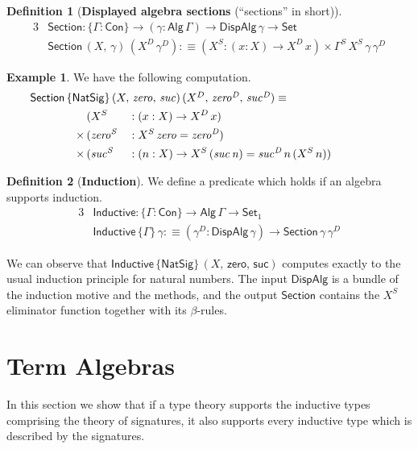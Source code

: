 \documentclass[12pt,a4paper,twoside,openany]{book}
\theoremstyle{remark}
\theoremstyle{definition}
\newtheorem{mydefinition}{Definition}
\newtheorem{myexample}{Example}
\theoremstyle{theorem}
\newcommand{\mi}[1]{\mathit{#1}}
\newcommand{\ms}[1]{\mathsf{#1}}
\newcommand{\Con}{\mathsf{Con}}
\newcommand{\Set}{\mathsf{Set}}
\newcommand{\Alg}{\ms{Alg}}
\newcommand{\DispAlg}{\ms{DispAlg}}
\newcommand{\Section}{\ms{Section}}
\newcommand{\Inductive}{\ms{Inductive}}
\newcommand{\defn}{:\equiv}
\begin{document}
\begin{mydefinition}[\textbf{Displayed algebra sections} (``sections'' in short)]
\begin{alignat*}{3}
  & \Section : \{\Gamma : \Con\} \to (\gamma : \Alg\,\Gamma) \to \DispAlg\,\gamma \to \Set\\
  & \Section\,(X,\,\gamma)\,(X^D\,\gamma^D) \defn (X^S : (x : X) \to X^D\,x) \times \Gamma^S\,X^S\,\gamma\,\gamma^D
\end{alignat*}
\end{mydefinition}
\begin{myexample} We have the following computation.
\begin{alignat*}{3}
  & \hspace{-5em}\rlap{$\Section\,\{\ms{NatSig}\}\,(X,\,\mi{zero},\,\mi{suc})\,(X^D,\,\mi{zero^D},\,\mi{suc^D}) \equiv$}\\
              & (X^S &&: (x : X) \to X^D\,x)\\
      \times\,& (\mi{zero^S} &&: X^S\,\mi{zero} = \mi{zero^D})\\
      \times\,& (\mi{suc^S} &&: (n : X) \to X^S\,(\mi{suc\,n}) = \mi{suc^D}\,n\,(X^S\,n))
\end{alignat*}
\end{myexample}

\begin{mydefinition}[\textbf{Induction}]
We define a predicate which holds if an algebra supports induction.
\begin{alignat*}{3}
  & \Inductive : \{\Gamma : \Con\} \to \Alg\,\Gamma \to \Set_1\\
  & \Inductive\,\{\Gamma\}\,\gamma \defn
     (\gamma^D : \DispAlg\,\gamma) \to \Section\,\gamma\,\gamma^D
\end{alignat*}
\end{mydefinition}

We can observe that $\Inductive\,\{\ms{NatSig}\}\,(X,\,\ms{zero},\,\ms{suc})$
computes exactly to the usual induction principle for natural numbers. The input
$\DispAlg$ is a bundle of the induction motive and the methods, and the output
$\Section$ contains the $X^S$ eliminator function together with its
$\beta$-rules.

\section{Term Algebras}

In this section we show that if a type theory supports the inductive types comprising
the theory of signatures, it also supports every inductive type which is described
by the signatures.
\end{document}

